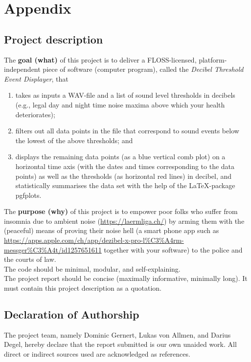 \section{Appendix}

\subsection{Project description}

The \textbf{goal (what)} of this project is to deliver a FLOSS-licensed, platform-independent piece of
software (computer program), called the \textit{Decibel Threshold Event Displayer}, that

\begin{enumerate}
    \item takes as inputs a WAV-file and a list of sound level thresholds in decibels (e.g., legal day
          and night time noise maxima above which your health deteriorates);
    \item filters out all data points in the file that correspond to sound events below the lowest of
          the above thresholds; and
    \item displays the remaining data points (as a blue vertical comb plot) on a horizontal time
          axis (with the dates and times corresponding to the data points) as well as the
          thresholds (as horizontal red lines) in decibel, and statistically summarises the data set
          with the help of the LaTeX-package pgfplots.
\end{enumerate}

The \textbf{purpose (why)} of this project is to empower poor folks who suffer from insomnia due to
ambient noise (\url{https://laermliga.ch/}) by arming them with the (peaceful) means of proving
their noise hell (a smart phone app such as \url{https://apps.apple.com/ch/app/dezibel-x-pro-l\%C3\%A4rm-messger\%C3\%A4t/id1257651611}
together with your software) to the police and the courts of law. \\

The code should be minimal, modular, and self-explaining. \\

The project report should be concise (maximally informative, minimally long). It must contain
this project description as a quotation.

\subsection{Declaration of Authorship}
The project team, namely Dominic Gernert, Lukas von Allmen, and Darius Degel, hereby declare that the report submitted is our own unaided work. All direct or indirect sources used are acknowledged as references.